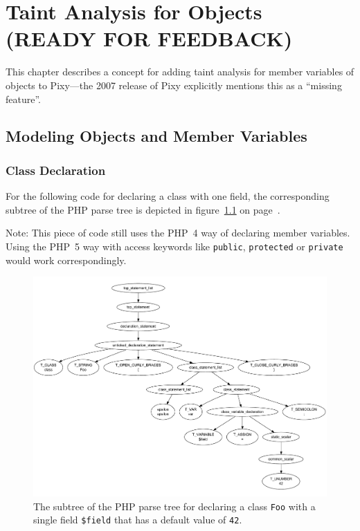 \chapter{Taint Analysis for Objects (READY FOR FEEDBACK)}
\label{field-tainting}

This chapter describes a concept for adding taint analysis for member variables of objects to Pixy---the 2007 release of Pixy explicitly mentions this as a ``missing feature''.


\section{Modeling Objects and Member Variables}


\subsection{Class Declaration}

For the following code for declaring a class with one field, the corresponding subtree of the PHP parse tree is depicted in figure~\ref{fig:parse-tree-foo-class} on page~\pageref{fig:parse-tree-foo-class}.


Note: This piece of code still uses the PHP~4 way of declaring member variables. Using the PHP~5 way with access keywords like \texttt{public}, \texttt{protected} or \texttt{private} would work correspondingly.

\begin{figure}[htb]
  \begin{center}
    \includegraphics[width=\linewidth, height=.9\textheight, keepaspectratio]{images/parsetree-foo-class-declaration}
    \caption{The subtree of the PHP parse tree for declaring a class \texttt{Foo} with a single field \texttt{\$field} that has a default value of \texttt{42}.}
    \label{fig:parse-tree-foo-class}
  \end{center}
\end{figure}

